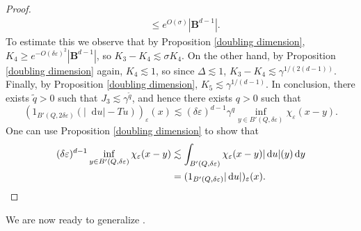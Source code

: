 \documentclass[reqno,12pt,letterpaper]{amsart}
\newcommand{\Ball}{\mathbf{B}}
\newcommand*\dif{\mathop{}\!\mathrm{d}}
\theoremstyle{definition}
\numberwithin{equation}{section}
\begin{document}
\begin{proof}
\begin{align*}
&\leq e^{O(\sigma)} |\Ball^{d - 1}|.
\end{align*}
To estimate this we observe that by Proposition \ref{doubling dimension}, $K_4 \geq e^{-O(\delta\varepsilon)^2}| \Ball^{d - 1}|$, so $K_3 - K_4 \lesssim \sigma K_4$.
On the other hand, by Proposition \ref{doubling dimension} again, $K_4 \lesssim 1$, so since $\Delta \lesssim 1$, $K_3 - K_4 \lesssim \gamma^{1/(2(d - 1))}$.
Finally, by Proposition \ref{doubling dimension}, $K_5 \lesssim \gamma^{1/(d - 1)}$.
In conclusion, there exists $\tilde q > 0$ such that $J_3 \lesssim \gamma^{\tilde q}$, and hence there exists $q > 0$ such that 
$$(1_{B'(Q, 2\delta\varepsilon)}(|\dif u| - Tu))_\varepsilon(x) \lesssim (\delta\varepsilon)^{d - 1} \gamma^q \inf_{y \in B'(Q, \delta\varepsilon)} \chi_\varepsilon(x - y).$$
One can use Proposition \ref{doubling dimension} to show that 
\begin{align*}
(\delta\varepsilon)^{d - 1} \inf_{y \in B'(Q, \delta\varepsilon)} \chi_\varepsilon(x - y) &\lesssim \int_{B'(Q, \delta\varepsilon)} \chi_\varepsilon(x - y) |\dif u|(y) \dif y \\
&= (1_{B'(Q, \delta\varepsilon)} |\dif u|)_\varepsilon(x). \qedhere
\end{align*}
\end{proof}

We are now ready to generalize \cite[Theorem 7.3]{Giusti77}.
\end{document}
